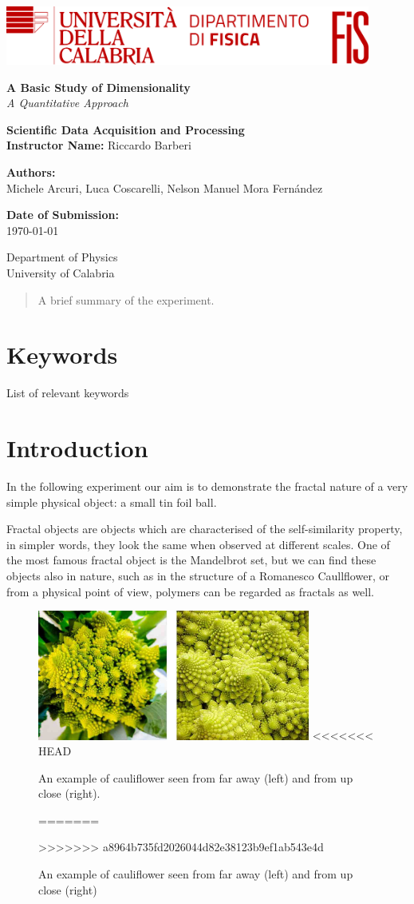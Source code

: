 \documentclass[a4paper,12pt]{article}
\newcommand{\customtitlepage}{
    

    \begin{titlepage}
        \includegraphics[width=0.9\textwidth]{logo.png}\\
        \centering
        \vspace*{1cm}
        
        \Huge\textbf{A Basic Study of Dimensionality}\\
        \vspace{0.5cm}
        \LARGE\textit{A Quantitative Approach}\\
        \vspace{1.5cm}
        
        \textbf{Scientific Data Acquisition and Processing} \\
        \textbf{Instructor Name:} Riccardo Barberi\\
        \vspace{0.5cm}
        
        \textbf{Authors:}\\
        \large Michele Arcuri, Luca Coscarelli, Nelson Manuel Mora Fernández\\
        \vfill
        
        \large \textbf{Date of Submission:}\\
        \today\\
        \vspace{1.5cm}
        
        \small
        Department of Physics \\
        University of Calabria\\
        \vspace{0.5cm}
    \end{titlepage}
}
\begin{document}
\customtitlepage

\begin{abstract}
    A brief summary of the experiment.
\end{abstract}


\section*{Keywords}
List of relevant keywords 

\newpage

\tableofcontents
\newpage

\section{Introduction}
\par In the following experiment our aim is to demonstrate the fractal nature 
of a very simple physical object: a small tin foil ball. 

\par Fractal objects are objects which are characterised of the self-similarity 
property, in simpler words, they look the same when observed at different scales.
One of the most famous fractal object is the Mandelbrot set, but we can find these 
objects also in nature, such as in the structure of a Romanesco Caullflower, or 
from a physical point of view, polymers can be regarded as fractals as well.

\begin{figure}[h]
    \centering
    \includegraphics[width = 0.8\textwidth]{Cauliflower.jpg}
<<<<<<< HEAD
    \caption{An example of cauliflower seen from far away (left) and from up close (right).}
=======
    \caption{An example of cauliflower seen from far away (left) and from up close (right)}
>>>>>>> a8964b735fd2026044d82e38123b9ef1ab543e4d
    \label{fig:Cauliflower}
\end{figure}
\end{document}
